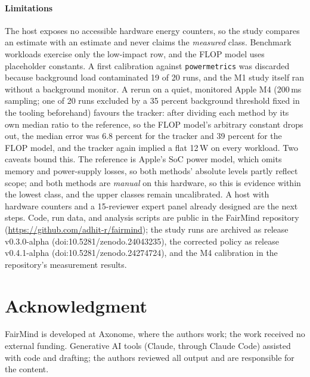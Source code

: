 \documentclass[10pt,conference]{IEEEtran}
\begin{document}
\paragraph{Limitations} The host exposes no accessible hardware energy
counters, so the study compares an estimate with an estimate and never claims
the \emph{measured} class. Benchmark workloads exercise only the low-impact
row, and the FLOP model uses placeholder constants. A first calibration
against \texttt{powermetrics} was discarded because background load
contaminated 19 of 20 runs, and the M1 study itself ran without a background
monitor. A rerun on a quiet, monitored Apple M4 (200\,ms sampling; one of 20
runs excluded by a 35 percent background threshold fixed in the tooling
beforehand) favours the tracker: after dividing each method by its own median
ratio to the reference, so the FLOP model's arbitrary constant drops out, the
median error was 6.8 percent for the tracker and 39 percent for the FLOP
model, and the tracker again implied a flat 12\,W on every workload. Two
caveats bound this. The reference is Apple's SoC power model, which omits
memory and power-supply losses, so both methods' absolute levels partly
reflect scope; and both methods are \emph{manual} on this hardware, so this is
evidence within the lowest class, and the upper classes remain uncalibrated. A host with hardware
counters and a 15-reviewer expert panel already designed are the next steps. Code, run data, and analysis scripts are public in the FairMind
repository (\url{https://github.com/adhit-r/fairmind}); the study runs are
archived as release v0.3.0-alpha (doi:10.5281/zenodo.24043235), the
corrected policy as release v0.4.1-alpha (doi:10.5281/zenodo.24274724), and
the M4 calibration in the repository's measurement results.

\section*{Acknowledgment}
FairMind is developed at Axonome, where the authors work; the work received no
external funding. Generative AI tools (Claude, through Claude Code) assisted
with code and drafting; the authors reviewed all output and are responsible for
the content.
\end{document}
